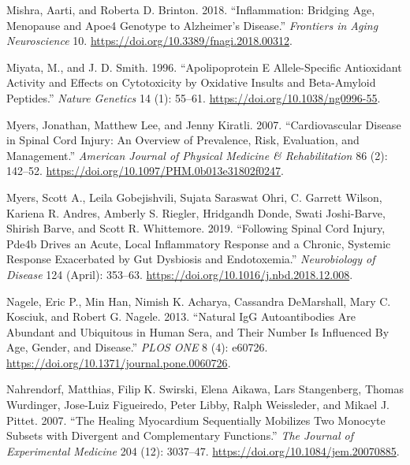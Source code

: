 \documentclass[9pt,lineno]{elife}
\newlength{\cslhangindent}
\newlength{\cslentryspacingunit} %
\newenvironment{CSLReferences}[2] %
 {%
  \setlength{\parindent}{0pt}
  \ifodd #1
  \let\oldpar\par
  \def\par{\hangindent=\cslhangindent\oldpar}
  \fi
  \setlength{\parskip}{#2\cslentryspacingunit}
 }%
 {}
\begin{document}
\begin{landscape}
\begin{landscape}
\begin{landscape}
\begin{landscape}
\begin{CSLReferences}{1}{0}
\leavevmode{}%
Mishra, Aarti, and Roberta D. Brinton. 2018. {``Inflammation: {Bridging Age}, {Menopause} and {Apoe4 Genotype} to {Alzheimer}'s {Disease}.''} \emph{Frontiers in Aging Neuroscience} 10. \url{https://doi.org/10.3389/fnagi.2018.00312}.

\leavevmode{}%
Miyata, M., and J. D. Smith. 1996. {``Apolipoprotein {E} Allele-Specific Antioxidant Activity and Effects on Cytotoxicity by Oxidative Insults and Beta-Amyloid Peptides.''} \emph{Nature Genetics} 14 (1): 55--61. \url{https://doi.org/10.1038/ng0996-55}.

\leavevmode{}%
Myers, Jonathan, Matthew Lee, and Jenny Kiratli. 2007. {``Cardiovascular {Disease} in {Spinal Cord Injury}: {An Overview} of {Prevalence}, {Risk}, {Evaluation}, and {Management}.''} \emph{American Journal of Physical Medicine \& Rehabilitation} 86 (2): 142--52. \url{https://doi.org/10.1097/PHM.0b013e31802f0247}.

\leavevmode{}%
Myers, Scott A., Leila Gobejishvili, Sujata Saraswat Ohri, C. Garrett Wilson, Kariena R. Andres, Amberly S. Riegler, Hridgandh Donde, Swati Joshi-Barve, Shirish Barve, and Scott R. Whittemore. 2019. {``Following Spinal Cord Injury, {Pde4b} Drives an Acute, Local Inflammatory Response and a Chronic, Systemic Response Exacerbated by Gut Dysbiosis and Endotoxemia.''} \emph{Neurobiology of Disease} 124 (April): 353--63. \url{https://doi.org/10.1016/j.nbd.2018.12.008}.

\leavevmode{}%
Nagele, Eric P., Min Han, Nimish K. Acharya, Cassandra DeMarshall, Mary C. Kosciuk, and Robert G. Nagele. 2013. {``Natural {IgG Autoantibodies Are Abundant} and {Ubiquitous} in {Human Sera}, and {Their Number Is Influenced By Age}, {Gender}, and {Disease}.''} \emph{PLOS ONE} 8 (4): e60726. \url{https://doi.org/10.1371/journal.pone.0060726}.

\leavevmode{}%
Nahrendorf, Matthias, Filip K. Swirski, Elena Aikawa, Lars Stangenberg, Thomas Wurdinger, Jose-Luiz Figueiredo, Peter Libby, Ralph Weissleder, and Mikael J. Pittet. 2007. {``The Healing Myocardium Sequentially Mobilizes Two Monocyte Subsets with Divergent and Complementary Functions.''} \emph{The Journal of Experimental Medicine} 204 (12): 3037--47. \url{https://doi.org/10.1084/jem.20070885}.


\end{CSLReferences}
\end{landscape}
\end{landscape}
\end{landscape}
\end{landscape}
\end{document}
